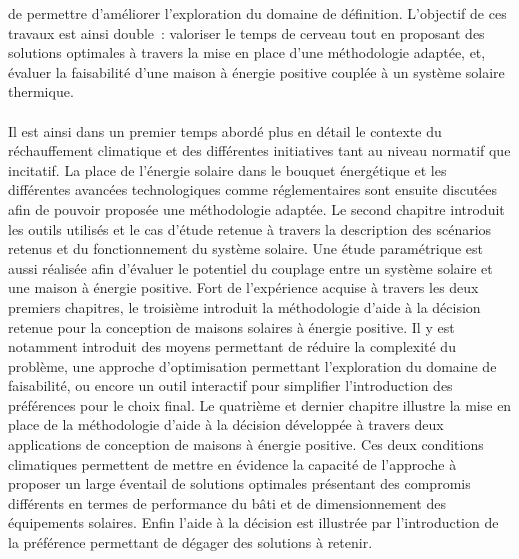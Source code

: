 de permettre d’améliorer l’exploration du domaine de définition.
L’objectif de ces travaux est ainsi double~: valoriser le temps de
cerveau tout en proposant des solutions optimales à travers la mise en place d’une
méthodologie adaptée, et, évaluer la faisabilité d’une maison à énergie positive couplée à
un système solaire thermique.

\paragraph{} %
Il est ainsi dans un premier temps abordé plus en détail le contexte du réchauffement
climatique et des différentes initiatives tant au niveau normatif que incitatif. La place
de l’énergie solaire dans le bouquet énergétique et les différentes avancées technologiques
comme réglementaires sont ensuite discutées afin de pouvoir proposée une méthodologie
adaptée. Le second chapitre introduit les outils utilisés et le cas d’étude retenue à
travers la description des scénarios retenus et du fonctionnement du système solaire. Une
étude paramétrique est aussi réalisée afin d’évaluer le potentiel du couplage entre un
système solaire et une maison à énergie positive. Fort de l’expérience acquise à travers
les deux premiers chapitres, le troisième introduit la méthodologie d’aide à la décision
retenue pour la conception de maisons solaires à énergie positive. Il y est notamment
introduit des moyens permettant de réduire la complexité du problème, une approche
d’optimisation permettant l’exploration du domaine de faisabilité, ou encore un outil
interactif pour simplifier l’introduction des préférences pour le choix final. Le
quatrième et dernier chapitre illustre la mise en place de la méthodologie d’aide à la
décision développée à travers deux applications de conception de maisons à énergie
positive. Ces deux conditions climatiques permettent de mettre en évidence la capacité de
l’approche à proposer un large éventail de solutions optimales présentant des compromis
différents en termes de performance du bâti et de dimensionnement des équipements
solaires. Enfin l’aide à la décision est illustrée par l’introduction de la préférence
permettant de dégager des solutions à retenir.
